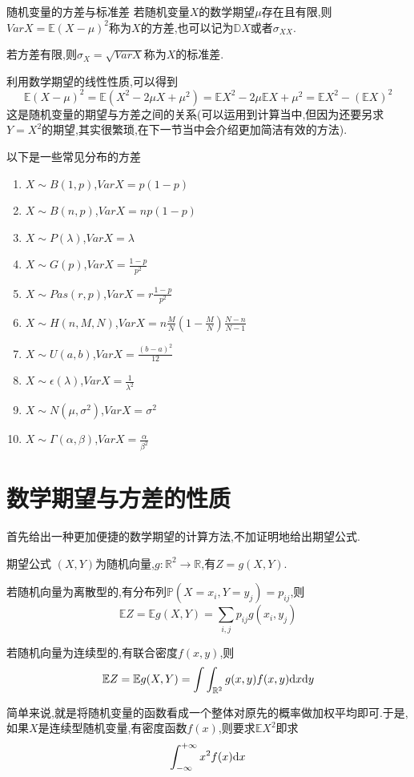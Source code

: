 \begin{definition}{随机变量的方差与标准差}{}
    若随机变量$X$的数学期望$\mu$存在且有限,则$Var X=\mathbb{E}(X-\mu)^2$称为$X$的方差,也可以记为$\mathbb{D}X$或者$\sigma_{XX}$.

    若方差有限,则$\sigma_X=\sqrt{VarX}$称为$X$的标准差.
\end{definition}
利用数学期望的线性性质,可以得到
$$\mathbb{E}(X-\mu)^2=\mathbb{E}(X^2-2\mu X+\mu^2)=\mathbb{E}X^2-2\mu\mathbb{E}X+\mu^2=\mathbb{E}X^2-(\mathbb{E}X)^2$$
这是随机变量的期望与方差之间的关系(可以运用到计算当中,但因为还要另求$Y=X^2$的期望,其实很繁琐,在下一节当中会介绍更加简洁有效的方法).

以下是一些常见分布的方差
\begin{enumerate}
    \item $X\sim B(1,p)$,$Var X=p(1-p)$
    \item $X\sim B(n,p)$,$Var X=np(1-p)$
    \item $X\sim P(\lambda)$,$Var X=\lambda$
    \item $X\sim G(p)$,$Var X=\frac{1-p}{p^2}$
    \item $X\sim Pas(r,p)$,$Var X=r\frac{1-p}{p^2}$
    \item $X\sim H(n,M,N)$,$Var X=n\frac{M}{N}\left(1-\frac{M}{N}\right)\frac{N-n}{N-1}$
    \item $X\sim U(a,b)$,$Var X=\frac{(b-a)^2}{12}$
    \item $X\sim \epsilon(\lambda)$,$Var X=\frac{1}{\lambda^2}$
    \item $X\sim N(\mu,\sigma^2)$,$Var X=\sigma^2$
    \item $X\sim \Gamma(\alpha,\beta)$,$Var X=\frac{\alpha}{\beta^2}$
\end{enumerate}
\section{数学期望与方差的性质}
首先给出一种更加便捷的数学期望的计算方法,不加证明地给出期望公式.
\begin{theorem}{期望公式}
    $(X,Y)$为随机向量,$g:\mathbb{R}^2\to \mathbb{R}$,有$Z=g(X,Y)$.

    若随机向量为离散型的,有分布列$\mathbb{P}(X=x_i,Y=y_j)=p_{ij}$,则 
    $$\mathbb{E}Z=\mathbb{E}g(X,Y)=\sum_{i,j}p_{ij}g(x_i,y_j)$$

    若随机向量为连续型的,有联合密度$f(x,y)$,则
    $$\mathbb{E}Z=\mathbb{E}g(X,Y)=\int\int_{\mathbb{R}^2}g(x,y)f(x,y){\rm d}x{\rm d}y$$
\end{theorem}
简单来说,就是将随机变量的函数看成一个整体对原先的概率做加权平均即可.于是,如果$X$是连续型随机变量,有密度函数$f(x)$,则要求$\mathbb{E}X^2$即求
$$\int_{-\infty}^{+\infty}x^2f(x){\rm d}x$$

